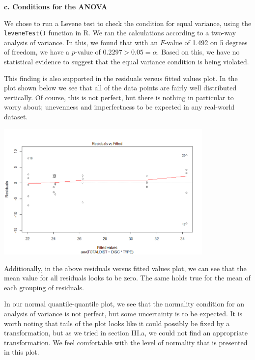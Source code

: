 \documentclass[letter,12pt]{article}
\begin{document}
	\begin{center}
		\textbf{c. Conditions for the ANOVA}\par
	\end{center}
	\justify
	We chose to run a Levene test to check the condition for equal variance, using the \verb!leveneTest()! function in R. We ran the calculations according to a two-way analysis of variance. In this, we found that with an $F$-value of 1.492 on 5 degrees of freedom, we have a $p$-value of $0.2297 > 0.05 = \alpha$. Based on this, we have no statistical evidence to suggest that the equal variance condition is being violated.\par
	This finding is also supported in the residuals versus fitted values plot. In the plot shown below we see that all of the data points are fairly well distributed vertically. Of course, this is not perfect, but there is nothing in particular to worry about; unevenness and imperfectness to be expected in any real-world dataset.\par
	\begin{center}
    \includegraphics[width=0.8\textwidth]{resfitthrow.png}
  \end{center}
  Additionally, in the above residuals versus fitted values plot, we can see that the mean value for all residuals looks to be zero. The same holds true for the mean of each grouping of residuals.\par
  In our normal quantile-quantile plot, we see that the normality condition for an analysis of variance is not perfect, but some uncertainty is to be expected. It is worth noting that tails of the plot looks like it could possibly be fixed by a transformation, but as we tried in section III.a, we could not find an appropriate transformation. We feel comfortable with the level of normality that is presented in this plot.\par
\end{document}
